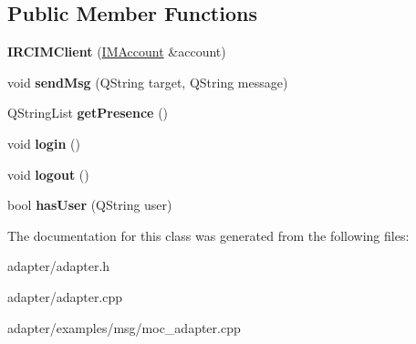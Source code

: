 \subsection*{Public Member Functions}
\begin{DoxyCompactItemize}
\item 
\hypertarget{classIRCIMClient_a5205a3ac78186c358f5783e2e258a85c}{
{\bfseries IRCIMClient} (\hyperlink{classIMAccount}{IMAccount} \&account)}
\label{classIRCIMClient_a5205a3ac78186c358f5783e2e258a85c}

\item 
\hypertarget{classIRCIMClient_a4e9046dc26fa3b9a52f098a9910c3ed4}{
void {\bfseries sendMsg} (QString target, QString message)}
\label{classIRCIMClient_a4e9046dc26fa3b9a52f098a9910c3ed4}

\item 
\hypertarget{classIRCIMClient_a9e2ffb96be85534373fb4748d46b99b7}{
QStringList {\bfseries getPresence} ()}
\label{classIRCIMClient_a9e2ffb96be85534373fb4748d46b99b7}

\item 
\hypertarget{classIRCIMClient_aaaa2b995bb752501a68c303b2af5c719}{
void {\bfseries login} ()}
\label{classIRCIMClient_aaaa2b995bb752501a68c303b2af5c719}

\item 
\hypertarget{classIRCIMClient_af6ee63c7d521693111736c344c9472d8}{
void {\bfseries logout} ()}
\label{classIRCIMClient_af6ee63c7d521693111736c344c9472d8}

\item 
\hypertarget{classIRCIMClient_a3a3059e4f284db277fc4d0092cca3b91}{
bool {\bfseries hasUser} (QString user)}
\label{classIRCIMClient_a3a3059e4f284db277fc4d0092cca3b91}

\end{DoxyCompactItemize}


The documentation for this class was generated from the following files:\begin{DoxyCompactItemize}
\item 
adapter/adapter.h\item 
adapter/adapter.cpp\item 
adapter/examples/msg/moc\_\-adapter.cpp\end{DoxyCompactItemize}
